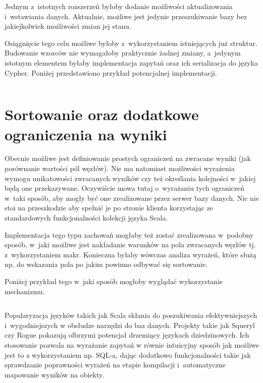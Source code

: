 \documentclass{xmgr}
\begin{document}
Jednym z~istotnych rozszerzeń byłoby dodanie możliwości aktualizowania i~wstawiania danych. Aktualnie, możliwe jest jedynie przeszukiwanie bazy bez jakiejkolwiek możliwości zmian jej stanu. 

Osiągnięcie tego celu możliwe byłoby z~wykorzystaniem istniejących już struktur. Budowanie wzorców nie wymagałoby praktycznie żadnej zmiany, a~jedynym istotnym elementem byłaby implementacja zapytań oraz ich serializacja do języka Cypher. Poniżej przedstawiono przykład potencjalnej implementacji.

\inputminted{scala}{listings/scala/missing-features-update.scala}

\section{Sortowanie oraz dodatkowe ograniczenia na wyniki}

Obecnie możliwe jest definiowanie prostych ograniczeń na zwracane wyniki (jak porównanie wartości pól węzłów). Nie ma natomiast możliwości wyrażenia wymogu unikatowości zwracanych wyników czy też określania kolejności w~jakiej będą one przekazywane. Oczywiście mowa tutaj o~wyrażaniu tych ograniczeń w~taki sposób, aby mogły być one zrealizowane przez serwer bazy danych. Nic nie stoi na przeszkodzie aby spełnić je po stronie klienta korzystając ze standardowych funkcjonalności kolekcji języka Scala.

Implementacja tego typu zachowań mogłaby też zostać zrealizowana w~podobny sposób, w~jaki możliwe jest nakładanie warunków na pola zwracanych węzłów tj. z~wykorzystaniem makr. Konieczna byłaby wówczas analiza wyrażeń, które służą np. do wskazania pola po jakim powinno odbywać się sortowanie. 

\medskip\noindent Poniżej przykład tego w~jaki sposób mogłoby wyglądać wykorzystanie mechanizmu.

\inputminted{scala}{listings/scala/missing-query-features.scala}

\summary

Popularyzacja języków takich jak Scala skłania do poszukiwania efektywniejszych i~wygodniejszych w obsłudze narzędzi do baz danych. Projekty takie jak Squeryl czy Rogue pokazują olbrzymi potencjał drzemiący językach dziedzinowych. Ich stosowanie pozwala na wyrażanie zapytań w równie intuicyjny sposób jak możliwe jest to z wykorzystaniem np. SQL-a, dając dodatkowo funkcjonalności takie jak sprawdzanie poprawności wyrażeń na etapie kompilacji i~automatyczne mapowanie wyników na obiekty.
\end{document}

